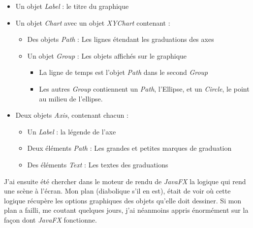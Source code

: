 \begin{itemize}
\item Un objet \textit{Label} : le titre du graphique
\item Un objet \textit{Chart} avec un objet \textit{XYChart} contenant :
  \begin{itemize}
  \item Des objets \textit{Path} : Les lignes étendant les graduations des axes
  \item Un objet \textit{Group} : Les objets affichés sur le graphique
    \begin{itemize}
    \item La ligne de temps est l'objet \textit{Path} dans le second \textit{Group}
    \item Les autres \textit{Group} contiennent un \textit{Path}, l'Ellipse, et un \textit{Circle}, le point au milieu de l'ellipse.
    \end{itemize}
  \end{itemize}
\item Deux objets \textit{Axis}, contenant chacun :
  \begin{itemize}
  \item Un \textit{Label} : la légende de l'axe
  \item Deux éléments \textit{Path} : Les grandes et petites marques de graduation
  \item Des éléments \textit{Text} : Les textes des graduations
  \end{itemize}
\end{itemize}

J'ai ensuite été chercher dans le moteur de rendu de \textit{JavaFX} la logique qui rend une scène à l'écran. Mon plan (diabolique s'il en est), était de voir où cette logique récupère les options graphiques des objets qu'elle doit dessiner. Si mon plan a failli, me coutant quelques jours, j'ai néanmoins appris énormément sur la façon dont \textit{JavaFX} fonctionne. 

